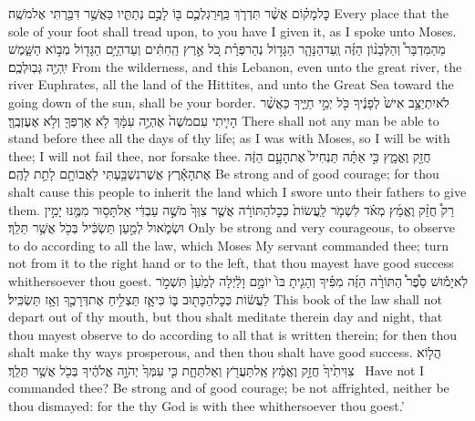 {כׇּל\maqqaf מָק֗וֹם אֲשֶׁ֨ר תִּדְרֹ֧ךְ כַּֽף\maqqaf רַגְלְכֶ֛ם בּ֖וֹ לָכֶ֣ם נְתַתִּ֑יו כַּאֲשֶׁ֥ר דִּבַּ֖רְתִּי אֶל\maqqaf מֹשֶֽׁה׃}
{Every place that the sole of your foot shall tread upon, to you have I given it, as I spoke unto Moses.}
{מֵהַמִּדְבָּר֩ וְהַלְּבָנ֨וֹן הַזֶּ֜ה וְֽעַד\maqqaf הַנָּהָ֧ר הַגָּד֣וֹל נְהַר\maqqaf פְּרָ֗ת כֹּ֚ל אֶ֣רֶץ הַֽחִתִּ֔ים וְעַד\maqqaf הַיָּ֥ם הַגָּד֖וֹל מְב֣וֹא הַשָּׁ֑מֶשׁ יִֽהְיֶ֖ה גְּבֽוּלְכֶֽם׃}
{From the wilderness, and this Lebanon, even unto the great river, the river Euphrates, all the land of the Hittites, and unto the Great Sea toward the going down of the sun, shall be your border.}
{לֹא\maqqaf יִתְיַצֵּ֥ב אִישׁ֙ לְפָנֶ֔יךָ כֹּ֖ל יְמֵ֣י חַיֶּ֑יךָ כַּאֲשֶׁ֨ר הָיִ֤יתִי עִם\maqqaf מֹשֶׁה֙ אֶהְיֶ֣ה עִמָּ֔ךְ לֹ֥א אַרְפְּךָ֖ וְלֹ֥א אֶעֶזְבֶֽךָּ׃}
{There shall not any man be able to stand before thee all the days of thy life; as I was with Moses, so I will be with thee; I will not fail thee, nor forsake thee.}
{חֲזַ֖ק וֶאֱמָ֑ץ כִּ֣י אַתָּ֗ה תַּנְחִיל֙ אֶת\maqqaf הָעָ֣ם הַזֶּ֔ה אֶת\maqqaf הָאָ֕רֶץ אֲשֶׁר\maqqaf נִשְׁבַּ֥עְתִּי לַאֲבוֹתָ֖ם לָתֵ֥ת לָהֶֽם׃}
{Be strong and of good courage; for thou shalt cause this people to inherit the land which I swore unto their fathers to give them.}
{רַק֩ חֲזַ֨ק וֶאֱמַ֜ץ מְאֹ֗ד לִשְׁמֹ֤ר לַֽעֲשׂוֹת֙ כְּכׇל\maqqaf הַתּוֹרָ֔ה אֲשֶׁ֤ר צִוְּךָ֙ מֹשֶׁ֣ה עַבְדִּ֔י אַל\maqqaf תָּס֥וּר מִמֶּ֖נּוּ יָמִ֣ין וּשְׂמֹ֑אול לְמַ֣עַן תַּשְׂכִּ֔יל בְּכֹ֖ל אֲשֶׁ֥ר תֵּלֵֽךְ׃}
{Only be strong and very courageous, to observe to do according to all the law, which Moses My servant commanded thee; turn not from it to the right hand or to the left, that thou mayest have good success whithersoever thou goest.}
{לֹֽא\maqqaf יָמ֡וּשׁ סֵ֩פֶר֩ הַתּוֹרָ֨ה הַזֶּ֜ה מִפִּ֗יךָ וְהָגִ֤יתָ בּוֹ֙ יוֹמָ֣ם וָלַ֔יְלָה לְמַ֙עַן֙ תִּשְׁמֹ֣ר לַעֲשׂ֔וֹת כְּכׇל\maqqaf הַכָּת֖וּב בּ֑וֹ כִּי\maqqaf אָ֛ז תַּצְלִ֥יחַ אֶת\maqqaf דְּרָכֶ֖ךָ וְאָ֥ז תַּשְׂכִּֽיל׃}
{This book of the law shall not depart out of thy mouth, but thou shalt meditate therein day and night, that thou mayest observe to do according to all that is written therein; for then thou shalt make thy ways prosperous, and then thou shalt have good success.}
{הֲל֤וֹא צִוִּיתִ֙יךָ֙ חֲזַ֣ק וֶאֱמָ֔ץ אַֽל\maqqaf תַּעֲרֹ֖ץ וְאַל\maqqaf תֵּחָ֑ת כִּ֤י עִמְּךָ֙ יְהֹוָ֣ה אֱלֹהֶ֔יךָ בְּכֹ֖ל אֲשֶׁ֥ר תֵּלֵֽךְ׃ \petucha }
{Have not I commanded thee? Be strong and of good courage; be not affrighted, neither be thou dismayed: for the \lord\space thy God is with thee whithersoever thou goest.’}

